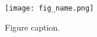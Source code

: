 \documentclass{article}
\begin{document}
\begin{figure}
\centering
\texttt{[image: fig\_name.png]}
\caption{Figure caption.}
\label{figure label}
\end{figure}
\end{document}
